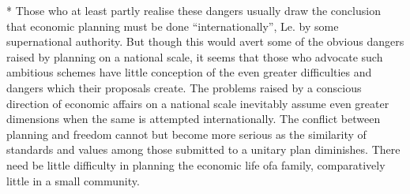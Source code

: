 \documentclass[11pt,openany]{book}
\begin{document}
\begin{center}\textasteriskcentered\hspace{0.9em}\textasteriskcentered\hspace{0.9em}\textasteriskcentered\end{center}

\begin{center}\textasteriskcentered\hspace{0.9em}\textasteriskcentered\hspace{0.9em}\textasteriskcentered\end{center}

* Those who at least partly realise these dangers usually draw the conclusion that economic planning must be done ``internationally'', Le. by some supernational authority. But though this would avert some of the obvious dangers raised by planning on a national scale, it seems that those who advocate such ambitious schemes have little conception of the even greater difficulties and dangers which their proposals create. The problems raised by a conscious direction of economic affairs on a national scale inevitably assume even greater dimensions when the same is attempted internationally. The conflict between planning and freedom cannot but become more serious as the similarity of standards and values among those submitted to a unitary plan diminishes. There need be little difficulty in planning the economic life ofa family, comparatively little in a small community.
\end{document}
